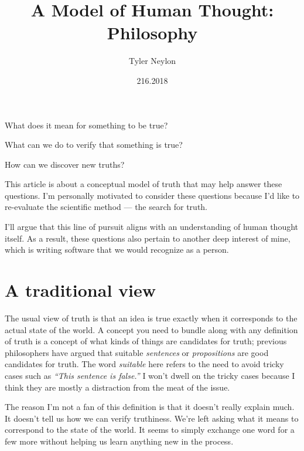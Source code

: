 \documentclass[20pt,]{extarticle}
\title{A Model of Human Thought: Philosophy}
\author{Tyler Neylon}
\date{216.2018}
\newcommand{\class}[1]{}
\newcommand{\optquad}{\quad}
\newcommand{\smallscrneg}{}
\newcommand{\smallscr}[1]{}
\newcommand{\bigscr}[1]{#1}
\newcommand{\smallscrskip}[1]{}
\begin{document}
\maketitle

\newcommand{\R}{\mathbb{R}}
\newcommand{\Z}{\mathbb{Z}}
\newcommand{\eqnset}[1]{\left.\mbox{$#1$}\;\;\right\rbrace\class{postbrace}{ }}
\providecommand{\optquad}{\class{optquad}{}}
\providecommand{\smallscrneg}{\class{smallscrneg}{ }}
\providecommand{\bigscr}[1]{\class{bigscr}{#1}}
\providecommand{\smallscr}[1]{\class{smallscr}{#1}}
\providecommand{\smallscrskip}[1]{\class{smallscrskip}{\hskip #1}}

What does it mean for something to be true?

What can we do to verify that something is true?

How can we discover new truths?

This article is about a conceptual model of truth that may help answer
these questions. I'm personally motivated to consider these questions
because I'd like to re-evaluate the scientific method --- the search for
truth.

I'll argue that this line of pursuit aligns with an understanding of
human thought itself. As a result, these questions also pertain to
another deep interest of mine, which is writing software that we would
recognize as a person.

\section{A traditional view}\label{a-traditional-view}

The usual view of truth is that an idea is true exactly when it
corresponds to the actual state of the world. A concept you need to
bundle along with any definition of truth is a concept of what kinds of
things are candidates for truth; previous philosophers have argued that
suitable \emph{sentences} or \emph{propositions} are good candidates for
truth. The word \emph{suitable} here refers to the need to avoid tricky
cases such as \emph{``This sentence is false.''} I won't dwell on the
tricky cases because I think they are mostly a distraction from the meat
of the issue.

The reason I'm not a fan of this definition is that it doesn't really
explain much. It doesn't tell us how we can verify truthiness. We're
left asking what it means to correspond to the state of the world. It
seems to simply exchange one word for a few more without helping us
learn anything new in the process.
\end{document}
